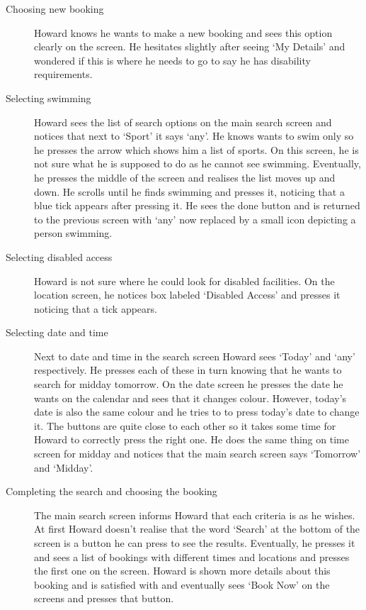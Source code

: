 \begin{description}
	\item[Choosing new booking] Howard knows he wants to make a new booking and
		sees this option clearly on the screen. He hesitates slightly after
		seeing `My Details' and wondered if this is where he needs to go to say
		he has disability requirements.

	\item[Selecting swimming] Howard sees the list of search options on the
		main search screen and notices that next to `Sport' it says `any'. He
		knows wants to swim only so he presses the arrow which shows him a list
		of sports. On this screen, he is not sure what he is supposed to do as
		he cannot see swimming. Eventually, he presses the middle of the screen
		and realises the list moves up and down. He scrolls until he finds
		swimming and presses it, noticing that a blue tick appears after
		pressing it. He sees the done button and is returned to the previous
		screen with `any' now replaced by a small icon depicting a person
		swimming.

	\item[Selecting disabled access] Howard is not sure where he could look for
		disabled facilities. On the location screen, he notices box labeled
		`Disabled Access' and presses it noticing that a tick appears.

	\item[Selecting date and time] Next to date and time in the search screen
		Howard sees `Today' and `any' respectively. He presses each of these in
		turn knowing that he wants to search for midday tomorrow. On the date
		screen he presses the date he wants on the calendar and sees that it
		changes colour. However, today's date is also the same colour and he
		tries to to press today's date to change it. The buttons are quite
		close to each other so it takes some time for Howard to correctly press
		the right one. He does the same thing on time screen for midday and
		notices that the main search screen says `Tomorrow' and `Midday'.

	\item[Completing the search and choosing the booking] The main search
		screen informs Howard that each criteria is as he wishes. At first
		Howard doesn't realise that the word `Search' at the bottom of the
		screen is a button he can press to see the results. Eventually, he
		presses it and sees a list of bookings with different times and
		locations and presses the first one on the screen. Howard is shown more
		details about this booking and is satisfied with and eventually sees
		`Book Now' on the screens and presses that button.
\end{description}

